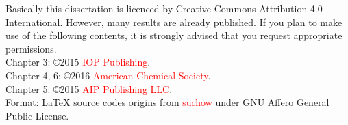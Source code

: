 
 Basically this dissertation is licenced by Creative Commons Attribution 4.0 International. However, many results are already published. If you plan to make use of the following contents, it is strongly advised that you request appropriate permissions. \\
 Chapter 3: \copyright 2015 \textcolor{Red}{IOP Publishing}. \\
 Chapter 4, 6: \copyright 2016 \textcolor{Red}{American Chemical Society}. \\
 Chapter 5: \copyright 2015 \textcolor{Red}{AIP Publishing LLC}. \\
 Format: \LaTeX \xspace source codes origins from \textcolor{Red}{suchow} under GNU Affero General Public License. 